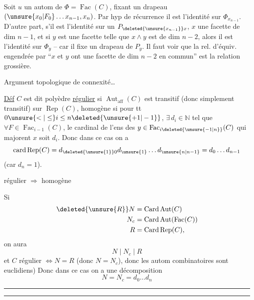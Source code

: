 Soit $u$ un autom de $\Phi=\operatorname{Fac}(C)$, fixant un drapeau $(\unsure{x_0|F_0}\ldots x_{n-1},x_n)$. Par hyp de récurrence il  est l'identité sur $\Phi_{x_{n-1}}$. D'autre part, s'il est l'identité sur un  $P_{\deleted{\unsure{x_{n-1}}}x}$, $x$ une facette de dim $n-1$, et si $y$ est une facette telle que $x\wedge y$ est de dim $n-2$, alors il est l'identité sur $\Phi_y$ -- car il fixe un drapeau de $P_y$. Il faut voir que la rel. d'équiv.  engendrée par ``$x$ et $y$ ont une facette de dim $n-2$ en commun'' est la relation grossière. 

Argument topologique de connexité\ldots

\uline{Déf} $C$  est dit polyèdre \uline{régulier} si $\operatorname{Aut}_{\mathrm{aff}}(C)$ est transitif (donc simplement transitif) sur $\operatorname{Rep}(C)$, homogène si pour tt $0\unsure{<|\leq}i\leq n\deleted{\unsure{+1|-1}}$, $\exists\,d_i\in\mathbb N$ tel que $\forall F\in\operatorname{Fac}_{i-1}(C)$, le cardinal de
l'ens des  $y\in\operatorname{Fac}_{i\deleted{\unsure{-1|n}}}(C)$ qui majorent $x$ soit $d_i$. Donc dans ce cas on a
\[
\operatorname{card}\operatorname{Rep}(C)=d_{\deleted{\unsure{1}}0}d_{\unsure{1}}\ldots d_{\unsure{n|n-1}}=d_0\ldots d_{n-1}
\]
(car $d_n=1$). 

 régulier $\Rightarrow$ homogène


Si
\[
\begin{aligned}
\deleted{\unsure{R}}N&=\operatorname{Card}\operatorname{Aut}(C)\\
N_c&=\operatorname{Card}\operatorname{Aut}(\operatorname{Fac}(C))\\
R&=\operatorname{Card}\operatorname{Rep}(C),
\end{aligned}
\]
on aura
\[
N\mid N_c\mid R
\]
et $C$ régulier $\Longleftrightarrow N=R$ (donc $N=N_c$), donc les autom combinatoires sont euclidiens) Donc dans ce cas on a une décomposition
\[
N=N_c=d_0\ldots d_n
\]

\noindent\rule{2em}{0.4pt}\par\nobreak\noindent\rule{2em}{0.4pt}

